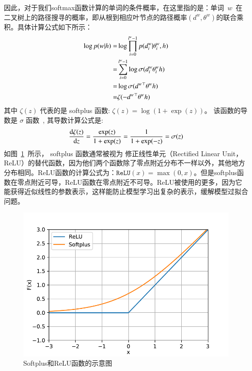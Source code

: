 因此，对于我们softmax函数计算的单词的条件概率，在这里指的是：单词~$w$~在二叉树上的路径搜寻的概率，即从根到相应叶节点的路径概率$(d^w,\theta^w)$的联合乘积。具体计算公式如下所示：
\begin{equation}\label{equ:pw}
\setlength{\abovedisplayskip}{10pt}
\setlength{\belowdisplayskip}{10pt}
\begin{split}
 \log p(w|h)=&\log\prod_{i=0}^{l^w-1} p(d^w_i|\theta_{i}^w,h) \\
 =& \sum_{i=0}^{l^w -1} \log\sigma(d_i^w \theta_{i}^w h)\\
 =&\log\sigma({d^w}^\top \theta^w h)\\
 =&\zeta(- {d^w}^\top \theta^w h )
 \end{split}
\end{equation}
其中 $\zeta(z)$ 代表的是 softplus 函数: $\zeta(z)= \log (1+\exp(z))$。 该函数的导数是 $\sigma$ 函数~, 其导数计算公式是:
\begin{equation}\label{equ:zeta}
\setlength{\abovedisplayskip}{10pt}
\setlength{\belowdisplayskip}{10pt}
\begin{split}
\frac{\mathrm{d}\zeta(z)}{\mathrm{d} z}=\frac{\exp(z)}{1+\exp(z)} =\frac{1}{1+\exp(-z)} =\sigma(z)
\end{split}
\end{equation}
如图~\ref{fig:soft}~所示， softplus 函数通常被视为 修正线性单元（Rectified Linear Unit，ReLU）的替代函数，因为他们两个函数除了零点附近分布不一样以外，其他地方分布相同。ReLU函数的计算公式为：$\mathtt{ReLU}(x)=\max(0,x)$。但是softplus函数在零点附近可导，ReLU函数在零点附近不可导。ReLU被使用的更多，因为它能获得近似线性的参数表示，这样能防止模型学习出复杂的表示，缓解模型过拟合问题。
\begin{figure}[!ht]
  \centering
\includegraphics[width=.65\linewidth]{./figures/relus.pdf}
\caption{Softplus和ReLU函数的示意图}\label{fig:soft}
\end{figure}

